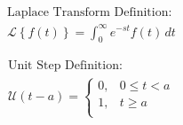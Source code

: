 \documentclass[12pt]{article}
\begin{document}
\begin{multicols}{2}

  \begin{equation*}
    \begin{split}
      \text{Laplace Transform Definition:}\\
      \mathcal{L}\left\{ f(t) \right\}=\int_0^{\infty}e^{-st}f(t)\,dt
      \end{split}
    \label{1}
  \end{equation*}

  \begin{equation*}
    \begin{split}
      \text{Unit Step Definition:}\\
      \mathcal{U}(t-a)=\left\{\begin{array}{ll} 0, & 0\leq t < a\\ 1, & t \geq a \\ \end{array}
    \end{split}
    \label{2}
  \end{equation*}

\end{multicols}
\end{document}
